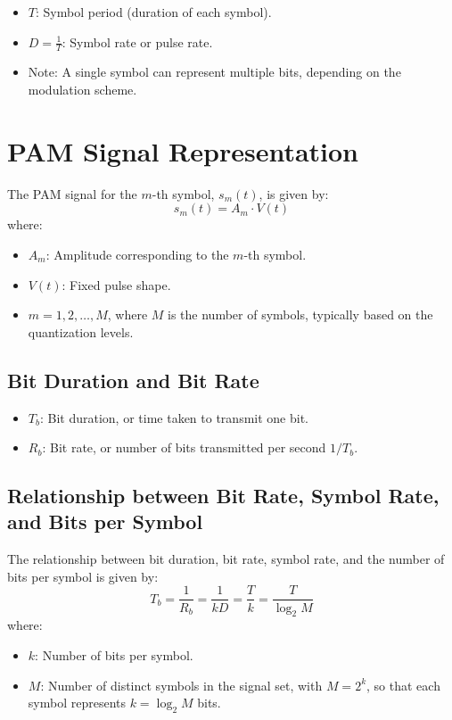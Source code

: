 \documentclass[10pt]{article}
\begin{document}
\begin{itemize}
    \item \( T \): Symbol period (duration of each symbol).
    \item \( D = \frac{1}{T} \): Symbol rate or pulse rate.

    \item Note: A single symbol can represent multiple bits, depending on the modulation scheme.
\end{itemize}

\section{PAM Signal Representation}
The PAM signal for the \( m \)-th symbol, \( s_m(t) \), is given by:
\[
s_m(t) = A_m \cdot V(t)
\]
where:
\begin{itemize}
    \item \( A_m \): Amplitude corresponding to the \( m \)-th symbol.
    \item \( V(t) \): Fixed pulse shape.
    \item \( m = 1, 2, \dots, M \), where \( M \) is the number of symbols, typically based on the quantization levels.
\end{itemize}

\subsection{Bit Duration and Bit Rate}
\begin{itemize}
    \item \( T_b \): Bit duration, or time taken to transmit one bit.
    \item \( R_b \): Bit rate, or number of bits transmitted per second $1/T_b$.
\end{itemize}

\subsection{Relationship between Bit Rate, Symbol Rate, and Bits per Symbol}
The relationship between bit duration, bit rate, symbol rate, and the number of bits per symbol is given by:
\[
T_b = \frac{1}{R_b} = \frac{1}{kD} = \frac{T}{k} = \frac{T}{\log_2 M}
\]
where:
\begin{itemize}
    \item \( k \): Number of bits per symbol.
    \item \( M \): Number of distinct symbols in the signal set, with \( M = 2^k \), so that each symbol represents \( k = \log_2 M \) bits.
\end{itemize}
\end{document}
